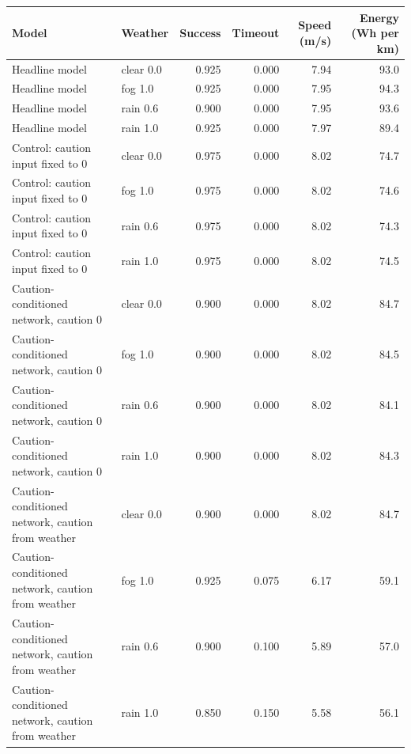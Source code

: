 \begin{tabular}{@{}llrrrr@{}}\toprule
Model & Weather & Success & Timeout & Speed (m/s) & Energy (Wh per km)\\\midrule
Headline model & clear 0.0 & 0.925 & 0.000 & 7.94 & 93.0\\
Headline model & fog 1.0 & 0.925 & 0.000 & 7.95 & 94.3\\
Headline model & rain 0.6 & 0.900 & 0.000 & 7.95 & 93.6\\
Headline model & rain 1.0 & 0.925 & 0.000 & 7.97 & 89.4\\
Control: caution input fixed to 0 & clear 0.0 & 0.975 & 0.000 & 8.02 & 74.7\\
Control: caution input fixed to 0 & fog 1.0 & 0.975 & 0.000 & 8.02 & 74.6\\
Control: caution input fixed to 0 & rain 0.6 & 0.975 & 0.000 & 8.02 & 74.3\\
Control: caution input fixed to 0 & rain 1.0 & 0.975 & 0.000 & 8.02 & 74.5\\
Caution-conditioned network, caution 0 & clear 0.0 & 0.900 & 0.000 & 8.02 & 84.7\\
Caution-conditioned network, caution 0 & fog 1.0 & 0.900 & 0.000 & 8.02 & 84.5\\
Caution-conditioned network, caution 0 & rain 0.6 & 0.900 & 0.000 & 8.02 & 84.1\\
Caution-conditioned network, caution 0 & rain 1.0 & 0.900 & 0.000 & 8.02 & 84.3\\
Caution-conditioned network, caution from weather & clear 0.0 & 0.900 & 0.000 & 8.02 & 84.7\\
Caution-conditioned network, caution from weather & fog 1.0 & 0.925 & 0.075 & 6.17 & 59.1\\
Caution-conditioned network, caution from weather & rain 0.6 & 0.900 & 0.100 & 5.89 & 57.0\\
Caution-conditioned network, caution from weather & rain 1.0 & 0.850 & 0.150 & 5.58 & 56.1\\
\bottomrule\end{tabular}
